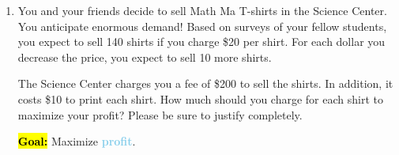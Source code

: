 \documentclass{article}
\newcommand{\highlight}[1]{\boldmath\hl{\textbf{#1}}\unboldmath}
\newcommand{\goal}[1]{\textbf{\textcolor{skyblue}{#1}}}
\theoremstyle{theorem}
\begin{document}
\begin{enumerate}
\begin{enumerate}
  \item
    \begin{problem}[\nstretch{0.25}]
      Is your approximation an upper bound or lower bound for the actual value of $\sqrt[5]{34}$? Use a picture to explain why. 
    \end{problem}

    \begin{solution}
      Using the picture we sketched in (a), the actual value of $\sqrt[5]{34}$ is the $y$-value of the black graph at $x = 34$. We approximated it using the $y$-value of the pink tangent line at $x = 34$. Since the tangent line is above $y = \sqrt[5]{x}$, our estimate is therefore an . 

    \end{solution}

  \end{enumerate}

\item \label{fall2018-prefinal-practice2-4}  

  \begin{problem}[\newpage]
    You and your friends decide to sell Math Ma T-shirts in the Science Center. You anticipate enormous demand! Based on surveys of your fellow students, you expect to sell 140 shirts if you charge \$20 per shirt. For each dollar you decrease the price, you expect to sell 10 more shirts.

    The Science Center charges you a fee of \$200 to sell the shirts. In addition, it costs \$10 to print each shirt. How much should you charge for each shirt to maximize your profit? Please be sure to justify completely. 
  \end{problem}

  \begin{solution}
    \highlight{Goal:} Maximize \goal{profit}.


\end{solution}
\end{enumerate}
\end{document}
